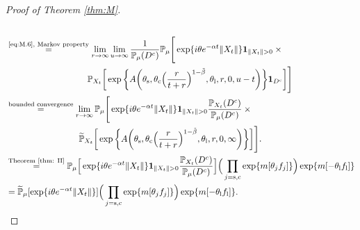 \documentclass[12pt,a4paper]{amsart}
\theoremstyle{plain}
\theoremstyle{definition}
\numberwithin{equation}{section}
\begin{document}
\begin{proof}[Proof of Theorem \ref{thm:M}]
\begin{align}
\\&\begin{multlined}
\overset{\text{\eqref{eq:M.6}, Markov property}}=\lim_{r\to \infty}\lim_{u\rightarrow\infty}\frac{1}{\mathbb P_{\mu}(D^c)} \mathbb P_{\mu}\Bigg[\exp\{ i\theta e^{-\alpha t}\|X_t\|\}\mathbf 1_{\|X_t\|>0} \times {}
\\ \mathbb P_{X_t}\bigg[\exp\bigg\{A\bigg(\theta_\mathrm s,\theta_\mathrm c\Big(\frac{r}{t+r}\Big)^{1-\tilde \beta},\theta_\mathrm l,r,0,u-t\bigg)\bigg\}\mathbf 1_{D^c}\bigg]\Bigg]
\end{multlined}
\\&\begin{multlined}\overset{\text{bounded convergence}}=\lim_{r\to \infty} \mathbb P_{\mu}\Bigg[\exp\{ i\theta e^{-\alpha t}\|X_t\|\} \mathbf 1_{\|X_t\|>0}\frac{\mathbb P_{X_t}(D^c)}{\mathbb P_{\mu}(D^c)} \times {}
\\\widetilde{\mathbb P}_{X_t}\bigg[\exp\bigg\{A\bigg(\theta_\mathrm s,\theta_\mathrm c\Big(\frac{r}{t+r}\Big)^{1-\tilde \beta},\theta_\mathrm l,r,0,\infty\bigg)\bigg\}\bigg]\Bigg].
\end{multlined}
\\& \overset{\text{Theorem \ref{thm: II}}}=  \mathbb P_{\mu}\Big[\exp\{ i\theta e^{-\alpha t}\|X_t\|\} \mathbf 1_{\|X_t\|>0}\frac{\mathbb P_{X_t}(D^c)}{\mathbb P_{\mu}(D^c)} \Big]\Big(\prod_{j=\mathrm s,\mathrm c}\exp\{m[\theta_j f_j]\}\Big)\exp\{m[-\theta_\mathrm l f_\mathrm l]\}
\\&=\widetilde{\mathbb P}_{\mu}[\exp\{i\theta e^{-\alpha t}\|X_t\|\}]
\Big(\prod_{j=\mathrm s,\mathrm c}\exp\{m[\theta_j f_j]\}\Big)\exp\{m[-\theta_\mathrm l f_\mathrm l]\}.
\qedhere
\end{align}
\end{proof}

\appendix
\end{document}

